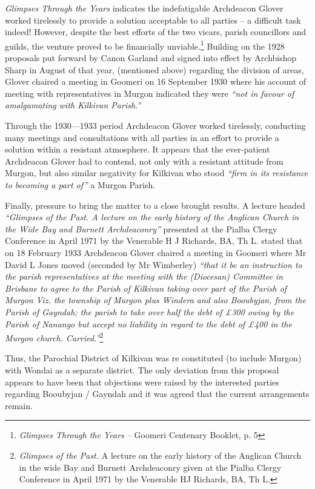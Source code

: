\emph{Glimpses Through the Years} indicates the indefatigable Archdeacon Glover worked tirelessly to provide a solution acceptable to all parties -- a difficult task indeed! However, despite the best efforts of the two vicars, parish councillors and guilds, the venture proved to be financially unviable.\footnote{\emph{Glimpses Through the Years --} Goomeri Centenary Booklet, p. 5} Building on the 1928 proposals put forward by Canon Garland and signed into effect by Archbishop Sharp in August of that year, (mentioned above) regarding the division of areas, Glover chaired a meeting in Goomeri on 16 September 1930 where his account of meeting with representatives in Murgon indicated they were \emph{``not in favour of amalgamating with Kilkivan Parish.''}

Through the 1930---1933 period Archdeacon Glover worked tirelessly, conducting many meetings and consultations with all parties in an effort to provide a solution within a resistant atmosphere. It appears that the ever-patient Archdeacon Glover had to contend, not only with a resistant attitude from Murgon, but also similar negativity for Kilkivan who stood \emph{``firm in its resistance to becoming a part of''} a Murgon Parish.

Finally, pressure to bring the matter to a close brought results. A lecture headed \emph{``Glimpses of the Past. A lecture on the early history of the Anglican Church in the Wide Bay and Burnett Archdeaconry''} presented at the Pialba Clergy Conference in April 1971 by the Venerable H J Richards, BA, Th L. stated that on 18 February 1933 Archdeacon Glover chaired a meeting in Goomeri where Mr David L Jones moved (seconded by Mr Wimberley) \emph{``that it be an instruction to the parish representatives at the meeting with the (Diocesan) Committee in Brisbane to agree to the Parish of Kilkivan taking over part of the Parish of Murgon Viz. the township of Murgon plus Windera and also Booubyjan, from the Parish of Gayndah; the parish to take over half the debt of £300 owing by the Parish of Nanango but accept no liability in regard to the debt of £400 in the Murgon church. Carried.''}\footnote{\emph{Glimpses of the Past.} A lecture on the early history of the Anglican Church in the wide Bay and Burnett Archdeaconry given at the Pialba Clergy Conference in April 1971 by the Venerable HJ Richards, BA, Th L.}

Thus, the Parochial District of Kilkivan was re constituted (to include Murgon) with Wondai as a separate district. The only deviation from this proposal appears to have been that objections were raised by the interested parties regarding Booubyjan / Gayndah and it was agreed that the current arrangements remain.

